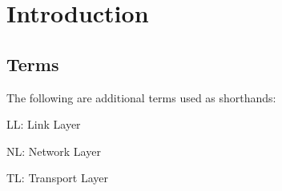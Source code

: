 \section{Introduction}



\subsection{Terms}
The following are additional terms used as shorthands:
\begin{listing}
\item LL: Link Layer
\item NL: Network Layer
\item TL: Transport Layer
\end{listing}



